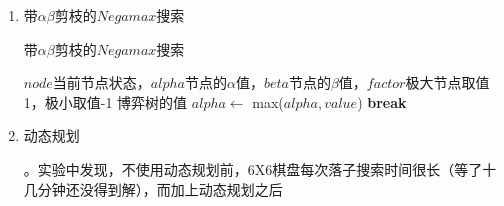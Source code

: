 \documentclass[10pt,letterpaper]{ctexart}
\begin{document}
\begin{enumerate}[itemindent=2.5em,label=\arabic*、]
    \item 带$\alpha \beta$剪枝的$Negamax$搜索
    \begin{algorithm}
      \caption{带$\alpha \beta$剪枝的$Negamax$搜索}
        \begin{algorithmic}[1] %
          \Require $node$当前节点状态，$alpha$节点的$\alpha$值，$beta$节点的$\beta$值，$factor$极大节点取值1，极小取值-1
          \Ensure 博弈树的值
                \State $alpha \gets$ max($alpha, value$)
                  \State \textbf{break}
                \EndIf
              \EndFor
              \State {}
            \EndFunction
        \end{algorithmic}
    \end{algorithm}
    \item 动态规划
    \par {}。实验中发现，不使用动态规划前，6X6棋盘每次落子搜索时间很长（等了十几分钟还没得到解），而加上动态规划之后

\end{enumerate}
\end{document}
